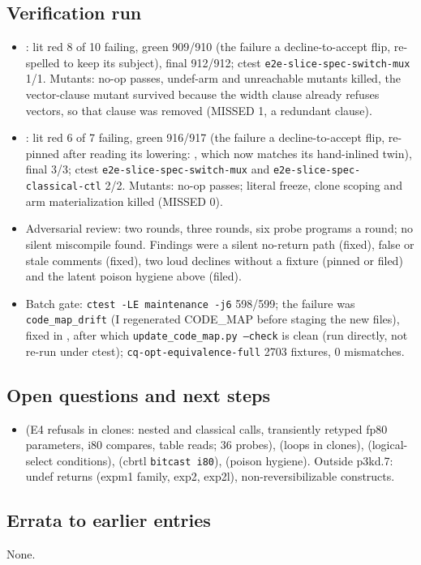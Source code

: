 \subsection*{Verification run}
\begin{itemize}
  \item {}: lit red 8 of 10 failing, green 909/910 (the failure a decline-to-accept
  flip, re-spelled to keep its subject), final 912/912; ctest \texttt{e2e-slice-spec-switch-mux} 1/1. Mutants: no-op passes,
  undef-arm and unreachable mutants killed, the vector-clause mutant survived because the width
  clause already refuses vectors, so that clause was removed (MISSED 1, a redundant clause).
  \item {}: lit red 6 of 7 failing, green 916/917 (the failure a decline-to-accept flip, re-pinned after reading its lowering: , which now matches its hand-inlined twin), final 3/3; ctest \texttt{e2e-slice-spec-switch-mux} and \texttt{e2e-slice-spec-classical-ctl} 2/2. Mutants: no-op passes; literal
  freeze, clone scoping and arm materialization killed (MISSED 0).
  \item Adversarial review:  two rounds,  three rounds, six probe
  programs a round; no silent miscompile found. Findings were a silent no-return path (fixed),
  false or stale comments (fixed), two loud declines without a fixture (pinned or filed) and
  the latent poison hygiene above (filed).
  \item Batch gate: \texttt{ctest -LE maintenance -j6} 598/599; the failure was \texttt{code\_map\_drift} (I regenerated CODE\_MAP before staging the new files), fixed in , after which \texttt{update\_code\_map.py --check} is clean (run directly, not re-run under ctest); \texttt{cq-opt-equivalence-full} 2703 fixtures, 0 mismatches.
\end{itemize}

\subsection*{Open questions and next steps}
\begin{itemize}
  \item {} (E4 refusals in clones: nested and classical calls, transiently retyped
  fp80 parameters, i80 compares, table reads; 36 probes),  (loops in clones),
   (logical-select conditions),  (cbrtl \texttt{bitcast i80}),
   (poison hygiene). Outside p3kd.7:  undef returns (expm1 family,
  exp2, exp2l),  non-reversibilizable constructs.
\end{itemize}

\subsection*{Errata to earlier entries}
None.
